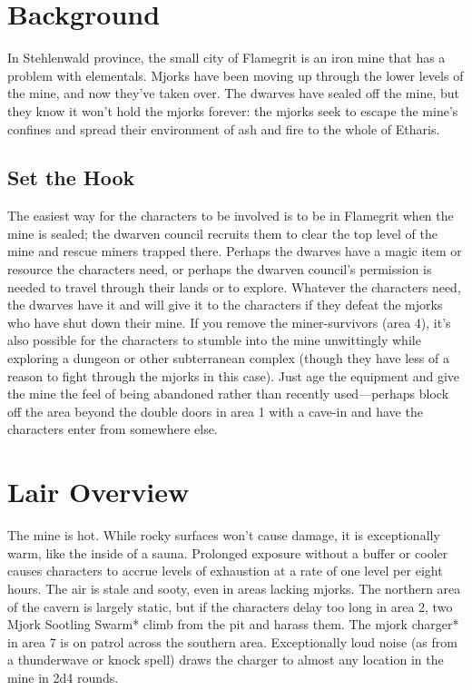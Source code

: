 \documentclass[10pt,a4paper,twoside,twocolumn,openany,bg=print,nodeprecatedcode]{dndbook}
\begin{document}
\section{Background}
In Stehlenwald province, the small city of Flamegrit is an iron mine that has a problem with elementals. Mjorks have been moving up through the lower levels of the mine, and now they've taken over. The dwarves have sealed off the mine, but they know it won't hold the mjorks forever: the mjorks seek to escape the mine's confines and spread their environment of ash and fire to the whole of Etharis.
\subsection{Set the Hook}
The easiest way for the characters to be involved is to be in Flamegrit when the mine is sealed; the dwarven council recruits them to clear the top level of the mine and rescue miners trapped there. Perhaps the dwarves have a magic item or resource the characters need, or perhaps the dwarven council's permission is needed to travel through their lands or to explore. Whatever the characters need, the dwarves have it and will give it to the characters if they defeat the mjorks who have shut down their mine.
If you remove the miner-survivors (area 4), it's also possible for the characters to stumble into the mine unwittingly while exploring a dungeon or other subterranean complex (though they have less of a reason to fight through the mjorks in this case). Just age the equipment and give the mine the feel of being abandoned rather than recently used—perhaps block off the area beyond the double doors in area 1 with a cave-in and have the characters enter from somewhere else.
\section{Lair Overview}
The mine is hot. While rocky surfaces won't cause damage, it is exceptionally warm, like the inside of a sauna. Prolonged exposure without a buffer or cooler causes characters to accrue levels of exhaustion at a rate of one level per eight hours. The air is stale and sooty, even in areas lacking mjorks. The northern area of the cavern is largely static, but if the characters delay too long in area 2, two Mjork Sootling Swarm* climb from the pit and harass them. The mjork charger* in area 7 is on patrol across the southern area. Exceptionally loud noise (as from a thunderwave or knock spell) draws the charger to almost any location in the mine in 2d4 rounds.
\end{document}
